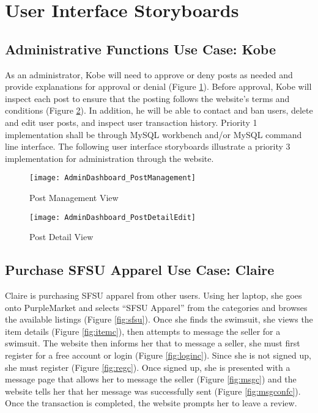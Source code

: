 \section{User Interface Storyboards}

\subsection{Administrative Functions Use Case: Kobe}
As an administrator, Kobe will need to approve or deny posts as needed and provide explanations for approval or denial (Figure \ref{fig:postmgmt}).  Before approval, Kobe will inspect each post to ensure that the posting follows the website's terms and conditions (Figure \ref{fig:postdetails}).  In addition, he will be able to contact and ban users, delete and edit user posts, and inspect user transaction history.  Priority 1 implementation shall be through MySQL workbench and/or MySQL command line interface.  The following user interface storyboards illustrate a priority 3 implementation for administration through the website.

\begin{figure}[h!]
\caption{Post Management View}
\label{fig:postmgmt}
\texttt{[image: AdminDashboard\_PostManagement]}
\end{figure}

\vspace{10mm}

\begin{figure}[h!]
\caption{Post Detail View}
\label{fig:postdetails}
\texttt{[image: AdminDashboard\_PostDetailEdit]}
\end{figure}

\pagebreak
\subsection{Purchase SFSU Apparel Use Case: Claire}
Claire is purchasing SFSU apparel from other users.  Using her laptop, she goes onto PurpleMarket and selects ``SFSU Apparel'' from the categories and browses the available listings (Figure \ref{fig:sfsu}).  Once she finds the swimsuit, she views the item details (Figure \ref{fig:itemc}), then attempts to message the seller for a swimsuit.  The website then informs her that to message a seller, she must first register for a free account or login (Figure \ref{fig:loginc}).  Since she is not signed up, she must register (Figure \ref{fig:regc}).  Once signed up, she is presented with a message page that allows her to message the seller (Figure \ref{fig:msgc}) and the website tells her that her message was successfully sent (Figure \ref{fig:msgconfc}).  Once the transaction is completed, the website prompts her to leave a review.

